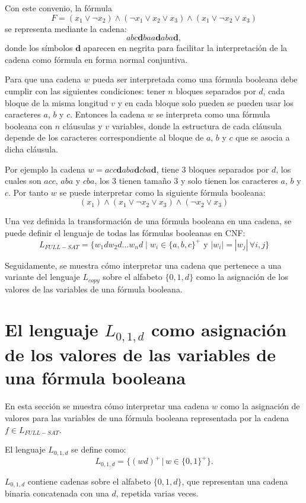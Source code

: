 Con este convenio, la fórmula
$$ F=(x_1 \vee \neg x_2) \wedge (\neg x_1 \vee x_2 \vee x_3) \wedge (x_1 \vee \neg x_2 \vee x_3)$$
se representa mediante la cadena:
$$abc\mathbf{d}baa\mathbf{d}aba\mathbf{d},$$
donde los símbolos $\mathbf{d}$ aparecen en negrita para facilitar la interpretación de la cadena como fórmula 
en forma normal conjuntiva.

Para que una cadena $w$ pueda ser interpretada como una fórmula booleana debe cumplir con las siguientes condiciones:
tener $n$ bloques separados por $d$, cada bloque de la misma longitud $v$ y en cada bloque solo pueden se pueden usar los caracteres
$a$, $b$ y $c$. Entonces la cadena $w$ se interpreta como una fórmula booleana con $n$ cláusulas y $v$ variables, donde la estructura
de cada cláusula depende de los caracteres correspondiente al bloque de $a$, $b$ y $c$ que se asocia a dicha cláusula.

Por ejemplo la cadena $w=acc\mathbf{d}aba\mathbf{d}cba\mathbf{d}$, tiene 3 bloques separados por $d$, los cuales son $acc$, $aba$ y $cba$, los 3 tienen tamaño 3 y solo tienen los caracteres $a$, $b$ y $c$.
Por tanto  $w$ se puede interpretar como la siguiente fórmula booleana:
$$(x_1)\wedge(x_1\vee \neg x_2 \vee x_3) \wedge (\neg x_2\vee x_3)$$

Una vez definida la transformación de una fórmula booleana en una cadena, se puede definir el lenguaje de todas las fórmulas booleanas en CNF:
\[
    L_{FULL-SAT} = \{ w_1dw_2d\dots w_nd \mid w_i \in \{a, b,c\}^+ \text{ y } |w_i| = |w_j| \, \forall i, j \}
\]

Seguidamente, se muestra cómo interpretar una cadena que pertenece a una variante 
del lenguaje $L_{copy}$ sobre el alfabeto $\{0,1,d\}$ como la asignación de los valores de las variables de una fórmula booleana.

\section{El lenguaje $L_{0,1,d}$ como asignación de los valores de las variables de una fórmula booleana}
\label{sec:intsat}

En esta sección se muestra cómo interpretar una cadena $w$ como la asignación de valores para las variables 
de una fórmula booleana representada por la cadena $f\in L_{FULL-SAT}$.

El lenguaje $L_{0,1,d}$ se define como:
$$L_{0,1,d}=\{(wd)^+\,|\,w\in\{0,1\}^+\}.$$

$L_{0,1,d}$ contiene cadenas sobre el alfabeto $\{0,1,d\}$, que representan una cadena binaria concatenada con una $d$,
repetida varias veces.

